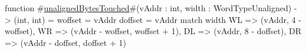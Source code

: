 function #\hyperref[zunalignedBytesTouched]{unalignedBytesTouched}#(vAddr : int, width : WordTypeUnaligned) -> (int, int) = {
  woffset = vAddr %
  doffset = vAddr %
  match width {
    WL => (vAddr, 4 - woffset),
    WR => (vAddr - woffset, woffset + 1),
    DL => (vAddr, 8 - doffset),
    DR => (vAddr - doffset, doffset + 1)
  }
}
